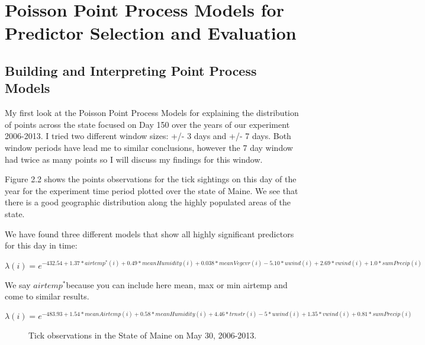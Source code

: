 \section{Poisson Point Process Models for Predictor Selection and Evaluation}

\subsection{ Building and Interpreting Point Process Models}

\noindent My first look at the Poisson Point Process Models for explaining the distribution of points across the state focused on Day 150 over the years of our experiment 2006-2013. I tried two different window sizes: +/- 3 days and +/- 7 days. Both window periods have lead me to similar conclusions, however the 7 day window had twice as many points so I will discuss my findings for this window.\newline

\noindent Figure 2.2 shows the points observations for the tick sightings on this day of the year for the experiment time period plotted over the state of Maine. We see that there is a good geographic distribution along the highly populated areas of the state. \newline

\noindent We have found three different models that show all highly significant predictors for this day in time:

\begin{equation}
\lambda(i) = e^{-432.54 + 1.37*airtemp^*(i) + 0.49*meanHumidity(i) + 0.038*meanVegcvr(i) - 5.10*uwind(i) + 2.69*vwind(i) + 1.0*sumPrecip(i) }
\end{equation}

\noindent We say $airtemp^* $because you can include here mean, max or min airtemp and come to similar results.


\begin{equation}
\lambda(i) = e^{-483.93 + 1.54*meanAirtemp(i) + 0.58*meanHumidity(i) + 4.46*trnstr(i) - 5*uwind(i) + 1.35*vwind(i) + 0.81*sumPrecip(i) }
\end{equation}
\newline


\begin{figure} [t]
\centerline{}
\caption{Tick observations in the State of Maine on May 30, 2006-2013.}
\label{fig6}
\end{figure}


